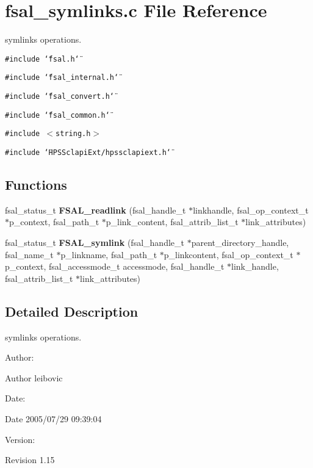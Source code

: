 \section{fsal\_\-symlinks.c File Reference}
\label{fsal__symlinks_8c}
symlinks operations.  


{\tt \#include \char`\"{}fsal.h\char`\"{}}\par
{\tt \#include \char`\"{}fsal\_\-internal.h\char`\"{}}\par
{\tt \#include \char`\"{}fsal\_\-convert.h\char`\"{}}\par
{\tt \#include \char`\"{}fsal\_\-common.h\char`\"{}}\par
{\tt \#include $<$string.h$>$}\par
{\tt \#include \char`\"{}HPSSclapiExt/hpssclapiext.h\char`\"{}}\par
\subsection*{Functions}
\begin{CompactItemize}
\item 
fsal\_\-status\_\-t {\bf FSAL\_\-readlink} (fsal\_\-handle\_\-t $\ast$linkhandle, fsal\_\-op\_\-context\_\-t $\ast$p\_\-context, fsal\_\-path\_\-t $\ast$p\_\-link\_\-content, fsal\_\-attrib\_\-list\_\-t $\ast$link\_\-attributes)
\item 
fsal\_\-status\_\-t {\bf FSAL\_\-symlink} (fsal\_\-handle\_\-t $\ast$parent\_\-directory\_\-handle, fsal\_\-name\_\-t $\ast$p\_\-linkname, fsal\_\-path\_\-t $\ast$p\_\-linkcontent, fsal\_\-op\_\-context\_\-t $\ast$p\_\-context, fsal\_\-accessmode\_\-t accessmode, fsal\_\-handle\_\-t $\ast$link\_\-handle, fsal\_\-attrib\_\-list\_\-t $\ast$link\_\-attributes)
\end{CompactItemize}


\subsection{Detailed Description}
symlinks operations. 

\begin{Desc}
\item[Author:]\end{Desc}
\begin{Desc}
\item[Author]leibovic \end{Desc}
\begin{Desc}
\item[Date:]\end{Desc}
\begin{Desc}
\item[Date]2005/07/29 09:39:04 \end{Desc}
\begin{Desc}
\item[Version:]\end{Desc}
\begin{Desc}
\item[Revision]1.15 \end{Desc}



